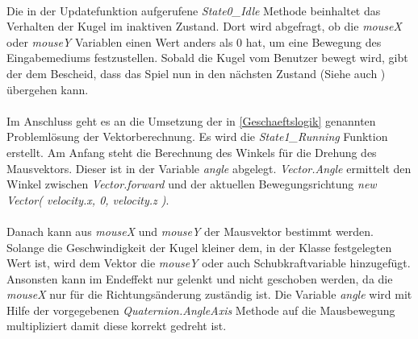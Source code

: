 

\paragraph{}
Die in der Updatefunktion aufgerufene \textit{State0{\_}Idle} Methode beinhaltet das Verhalten der Kugel im inaktiven Zustand. Dort wird abgefragt, ob die \textit{mouseX} oder \textit{mouseY} Variablen einen Wert anders als 0 hat, um eine Bewegung des Eingabemediums festzustellen. Sobald die Kugel vom Benutzer bewegt wird, gibt der  dem  Bescheid, dass das Spiel nun in den nächsten Zustand (Siehe auch ) übergehen kann.



\paragraph{}
Im Anschluss geht es an die Umsetzung der in \autoref{Geschaeftslogik}  genannten Problemlösung der Vektorberechnung. Es wird die \textit{State1{\_}Running} Funktion erstellt. Am Anfang steht die Berechnung des Winkels für die Drehung des Mausvektors. Dieser ist in der Variable \textit{angle} abgelegt. \textit{Vector.Angle} ermittelt den Winkel zwischen \textit{Vector.forward} und der aktuellen Bewegungsrichtung \textit{new Vector( velocity.x, 0, velocity.z )}.



\paragraph{}
Danach kann aus \textit{mouseX} und \textit{mouseY} der Mausvektor bestimmt werden. Solange die Geschwindigkeit der Kugel kleiner dem, in der Klasse  festgelegten Wert ist, wird dem Vektor die \textit{mouseY} oder auch Schubkraftvariable hinzugefügt. Ansonsten kann im Endeffekt nur gelenkt und nicht geschoben werden, da die \textit{mouseX} nur für die Richtungsänderung zuständig ist. Die Variable \textit{angle} wird mit Hilfe der vorgegebenen \textit{Quaternion.AngleAxis} Methode auf die Mausbewegung multipliziert damit diese korrekt gedreht ist.



